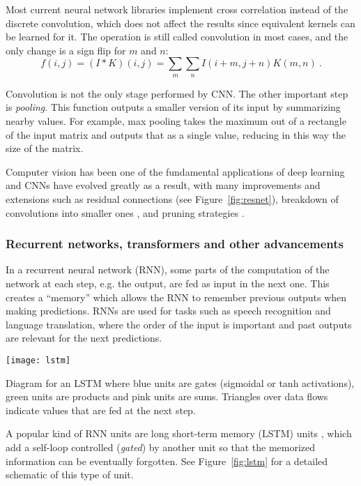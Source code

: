 Most current neural network libraries implement cross correlation instead of the discrete convolution, which does not affect the results since equivalent kernels can be learned for it. The operation is still called convolution in most cases, and the only change is a sign flip for $m$ and $n$:
\begin{equation}
    f(i,j)=\left(I\ast K\right)(i,j)=\sum_{m}\sum_{n}I(i+m,j+n)K(m,n)~.
\end{equation}

Convolution is not the only stage performed by CNN. The other important step is \textit{pooling}. This function outputs a smaller version of its input by summarizing nearby values. For example, max pooling  takes the maximum out of a rectangle of the input matrix and outputs that as a single value, reducing in this way the size of the matrix.

Computer vision has been one of the fundamental applications of deep learning and CNNs have evolved greatly as a result, with many improvements and extensions such as residual connections (see Figure~\ref{fig:resnet}), breakdown of convolutions into smaller ones , and pruning strategies .


\subsubsection{Recurrent networks, transformers and other advancements}

In a recurrent neural network (RNN), some parts of the computation of the network at each step, e.g. the output, are fed as input in the next one. This creates a ``memory'' which allows the RNN to remember previous outputs when making predictions. RNNs are used for tasks such as speech recognition and language translation, where the order of the input is important and past outputs are relevant for the next predictions.

\begin{marginfigure}
    \texttt{[image: lstm]}
    \caption{\label{fig:lstm}Diagram for an LSTM where blue units are gates (sigmoidal or tanh activations), green units are products and pink units are sums. Triangles over data flows indicate values that are fed at the next step.}
\end{marginfigure}

A popular kind of RNN units are long short-term memory (LSTM) units , which add a self-loop controlled (\textit{gated}) by another unit so that the memorized information can be eventually forgotten. See Figure~\ref{fig:lstm} for a detailed schematic of this type of unit.


